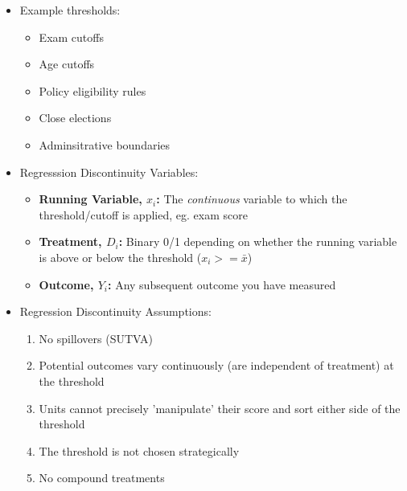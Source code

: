 \documentclass[xcolor=x11names,compress]{beamer}\usepackage[]{graphicx}\usepackage[]{xcolor}
\renewcommand{\(}{\begin{columns}}
\renewcommand{\)}{\end{columns}}
\newcommand{\<}[1]{\begin{column}{#1}}
\renewcommand{\>}{\end{column}}
\begin{document}
\begin{frame}
\begin{itemize}
\item Example thresholds:
\begin{itemize}
\item Exam cutoffs
\item Age cutoffs
\item Policy eligibility rules
\item Close elections
\item Adminsitrative boundaries
\end{itemize}
\end{itemize}
\end{frame}

\begin{frame}
\begin{itemize}
\item Regresssion Discontinuity Variables:
\begin{itemize}
\item \textbf{Running Variable, $x_i$:} The \textit{continuous} variable to which the threshold/cutoff is applied, eg. exam score
\pause
\item \textbf{Treatment, $D_i$:} Binary 0/1 depending on whether the running variable is above or below the threshold ($x_i>=\bar{x}$)
\pause
\item \textbf{Outcome, $Y_i$:} Any subsequent outcome you have measured
\end{itemize}
\end{itemize}
\end{frame}

\begin{frame}
\begin{itemize}
\item Regression Discontinuity Assumptions:
\begin{enumerate}
\item No spillovers (SUTVA)
\pause
\item Potential outcomes vary continuously (are independent of treatment) at the threshold
\pause
\item Units cannot precisely 'manipulate' their score and sort either side of the threshold
\pause
\item The threshold is not chosen strategically
\pause
\item No compound treatments
\end{enumerate}
\end{itemize}
\end{frame}
\end{document}
